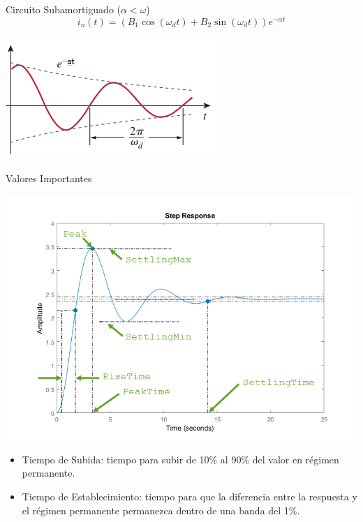 \documentclass[xcolor={usenames,svgnames,dvipsnames}]{beamer}
\begin{document}
\begin{frame}[label={sec:org312b9a1}]{Circuito Subamortiguado (\(\alpha < \omega\))}
\[
  \boxed{i_n(t) = (B_1\cos(\omega_d t) + B_2\sin(\omega_d t)) e^{-\alpha t}}
\]

\begin{center}
\includegraphics[width=.9\linewidth]{figs/Subamortiguado_AS.pdf}
\end{center}
\end{frame}

\begin{frame}[label={sec:orgdaafb23}]{Valores Importantes}
\begin{center}
\includegraphics[height=0.6\textheight]{figs/RespuestaEscalon_SegundoOrden.png}
\end{center}

\begin{itemize}
\item \alert{Tiempo de Subida}: tiempo para subir de 10\% al 90\% del valor en régimen permanente.

\item \alert{Tiempo de Establecimiento}: tiempo para que la diferencia entre la respuesta y el régimen permanente permanezca dentro de una banda del 1\%.
\end{itemize}
\end{frame}
\end{document}
